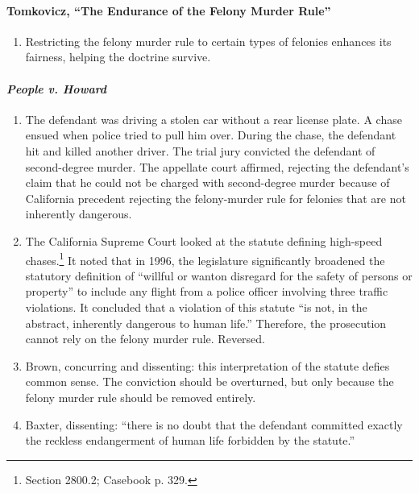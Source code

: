 \paragraph{Tomkovicz, ``The Endurance of the Felony Murder Rule''}

\begin{enumerate}
    \item Restricting the felony murder rule to certain types of felonies enhances its fairness, helping the doctrine survive.
\end{enumerate}

\paragraph{\emph{People v. Howard}}

\begin{enumerate}
    \item The defendant was driving a stolen car without a rear license plate. A chase ensued when police tried to pull him over. During the chase, the defendant hit and killed another driver. The trial jury convicted the defendant of second-degree murder. The appellate court affirmed, rejecting the defendant's claim that he could not be charged with second-degree murder because of California precedent rejecting the felony-murder rule for felonies that are not inherently dangerous. %
    \item The California Supreme Court looked at the statute defining high-speed chases.\footnote{Section 2800.2; Casebook p. 329.} It noted that in 1996, the legislature significantly broadened the statutory definition of ``willful or wanton disregard for the safety of persons or property'' to include any flight from a police officer involving three traffic violations. It concluded that a violation of this statute ``is not, in the abstract, inherently dangerous to human life.'' Therefore, the prosecution cannot rely on the felony murder rule. Reversed.
    \item Brown, concurring and dissenting: this interpretation of the statute defies common sense. The conviction should be overturned, but only because the felony murder rule should be removed entirely.
    \item Baxter, dissenting: ``there is no doubt that the defendant committed exactly the reckless endangerment of human life forbidden by the statute.''
\end{enumerate}

